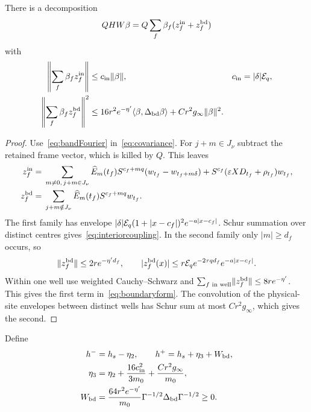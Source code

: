 \begin{lemma}\label{lem:coupling}
There is a decomposition
\[
 QHW\beta=Q\sum_f\beta_f(z_f^{\rm in}+z_f^{\rm bd})
\]
with
\begin{align}
 \left\|\sum_f\beta_fz_f^{\rm in}\right\|&\le c_{\rm in}\lVert \beta\rVert,
  &c_{\rm in}&=|\delta|\mathcal E_q,\label{eq:interiorcoupling}\\
 \left\|\sum_f\beta_fz_f^{\rm bd}\right\|^2
 &\le16r^2e^{-\eta'}\langle \beta,\Delta_{\rm bd}\beta\rangle
       +Cr^2g_\infty\lVert \beta\rVert^2.\label{eq:boundaryform}
\end{align}
\end{lemma}
\begin{proof}
Use~\eqref{eq:bandFourier} in~\eqref{eq:covariance}. For $j+m\in J_\nu$ subtract the retained frame vector, which is killed by $Q$. This leaves
\[
\begin{split}
 z_f^{\rm in}={}&\sum_{m\ne0,\,j+m\in J_\nu}\widehat E_m(t_f)
       S^{c_f+mq}(w_{t_f}-w_{t_f+m\delta})
       +S^{c_f}(\varepsilon XD_{t_f}+\rho_{t_f})w_{t_f},\\
 z_f^{\rm bd}={}&\sum_{j+m\notin J_\nu}\widehat E_m(t_f)
                         S^{c_f+mq}w_{t_f}.
\end{split}
\]
The first family has envelope
$|\delta|\mathcal E_q(1+|x-c_f|)^2e^{-a|x-c_f|}$.
Schur summation over distinct centres gives~\eqref{eq:interiorcoupling}. In the second family only $|m|\ge d_f$ occurs, so
\[
 \lVert z_f^{\rm bd}\rVert\le2re^{-\eta'd_f},\qquad
 |z_f^{\rm bd}(x)|\le r\mathcal E_q e^{-2\tau qd_f}e^{-a|x-c_f|}.
\]
Within one well use weighted Cauchy--Schwarz and
$\sum_{f\text{ in well}}\lVert z_f^{\rm bd}\rVert\le8re^{-\eta'}$.
This gives the first term in~\eqref{eq:boundaryform}. The convolution of the physical-site envelopes between distinct wells has Schur sum at most $Cr^2g_\infty$, which gives the second.
\end{proof}

Define
\begin{equation}\label{eq:sandwichdefs}
 \begin{split}
 h^-&=h_s-\eta_2,\qquad h^+=h_s+\eta_3+W_{\rm bd},\\
 \eta_3&=\eta_2+\frac{16c_{\rm in}^2}{3m_0}
                 +\frac{Cr^2g_\infty}{m_0},\\
 W_{\rm bd}&=\frac{64r^2e^{-\eta'}}{m_0}
           \Gamma^{-1/2}\Delta_{\rm bd}\Gamma^{-1/2}\ge0.
 \end{split}
\end{equation}

